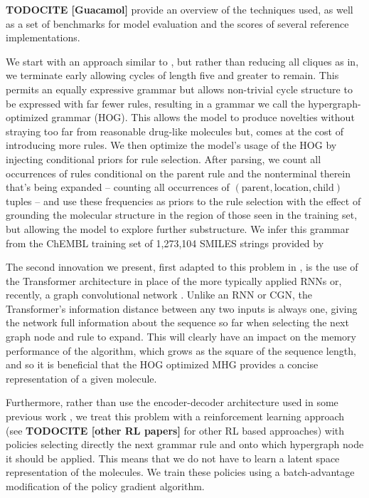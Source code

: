 \documentclass{article}
\newcommand{\CITE}[1]{{\bf TODOCITE [#1]}}
\begin{document}
\CITE{Guacamol} provide an overview of the techniques used, as well as a set of benchmarks for model evaluation and the scores of several reference implementations.

We start with an approach similar to  \cite{kajino2018}, but rather than reducing all cliques as in, we terminate early allowing cycles of length five and greater to remain. This permits an equally expressive grammar but allows non-trivial cycle structure to be expressed with far fewer rules, resulting in a grammar we call the hypergraph-optimized grammar (HOG). This allows the model to produce novelties without straying too far from reasonable drug-like molecules but, comes at the cost of introducing more rules. We then optimize the model's usage of the HOG by injecting conditional priors for rule selection. After parsing, we count all occurrences of rules conditional on the parent rule and the nonterminal therein that's being expanded -- counting all occurrences of $(\text{parent}, \text{location}, \text{child})$ tuples -- and use these frequencies as priors to the rule selection with the effect of grounding the molecular structure in the region of those seen in the training set, but allowing the model to explore further substructure. We infer this grammar from the ChEMBL training set of 1,273,104 SMILES strings provided by \cite{pogany2019} 

The second innovation we present, first adapted to this problem in \cite{kraev2018}, is the use of the Transformer architecture \cite{vaswani2017} in place of the more typically applied RNNs \cite{yang2017, olivecrona2017} or, recently, a graph convolutional network \cite{you2018}. Unlike an RNN or CGN, the Transformer's information distance between any two inputs is always one, giving the network full information about the sequence so far when selecting the next graph node and rule to expand. This will clearly have an impact on the memory performance of the algorithm, which grows as the square of the sequence length, and so it is beneficial that the HOG optimized MHG provides a concise representation of a given molecule.

Furthermore, rather than use the encoder-decoder architecture used in some previous work \cite{dai2018, jin2018, simonovsky2018, kusner2017, gomezbombarelli2016}, we treat this problem with a reinforcement learning approach (see \cite{popova2018} \CITE{other RL papers} for other RL based approaches) with policies selecting directly the next grammar rule and onto which hypergraph node it should be applied. This means that we do not have to learn a latent space representation of the molecules. We train these policies using a batch-advantage modification of the policy gradient algorithm.
\end{document}
